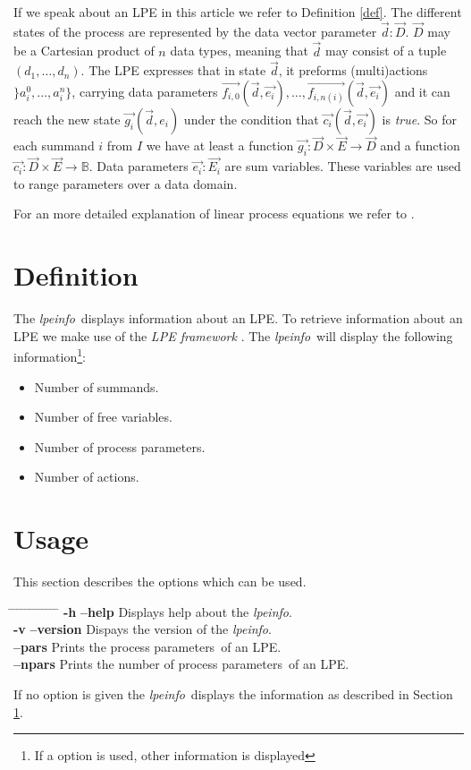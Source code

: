 \documentclass[a4paper,10pt]{article}
\theoremstyle{plain}
\theoremstyle{definition}
\newcommand{\lpe}{linear process equation}
\newcommand{\tool}{\textit{lpeinfo}}
\newcommand{\ti}{\textit}
\newcommand{\tb}{\textbf}
\newcommand{\ovr}{\overrightarrow}
\newcommand{\pps}{process parameters}
\newcommand{\framework}{\textit{LPE framework} \cite{LPEframework}}
\newcommand{\tab}{\hspace*{5.mm} \= \hspace*{5.mm} \= \hspace*{5.mm} \= \hspace*{5.mm} \= \hspace*{5.mm} \= \hspace*{5.mm}  \= \hspace*{5.mm}  \= \hspace*{5.mm}  \= \hspace*{5.mm} \= \hspace*{5.mm} \= \hspace*{5.mm}  \= \hspace*{5.mm}  \= \hspace*{5.mm}\kill}
\begin{document}
\noindent If we speak about an LPE in this article we refer to Definition \ref{def}.  The different states 
of the process are represented by the data vector parameter $\ovr{d}:\ovr{D}$. $\ovr{D}$ may be a Cartesian product of $n$ data types, meaning that $\ovr{d}$ may consist of a tuple $(d_1, \ldots, d_n)$. The LPE expresses that in state $\ovr{d}$, it preforms (multi)actions $\rbrace a_i^0, \ldots , a_i^n \rbrace$, carrying data parameters $\ovr{f_{i,0}}(\ovr{d},\ovr{e_i}), \ldots , \ovr{f_{i,n(i)}}(\ovr{d},\ovr{e_i})$ and 
it can reach the new state $\ovr{g_i}(\ovr{d},e_i)$ under the condition that $\ovr{c_i}(\ovr{d},\ovr{e_i})$ is \ti{true}. So for each summand $i$ from $I$ we have at least a function $\ovr{g_i}: \ovr{D} \times \ovr{E} \rightarrow \ovr{D}$ and a function $\ovr{c_i}: \ovr{D} \times \ovr{E} \rightarrow \mathbb{B}$.
Data parameters $\ovr{e_i} : \ovr{E_i}$ are sum variables. These variables are used to range parameters over a data domain. 

\noindent For an more detailed explanation of \lpe s  we refer to \cite{LPE_info}.

\section{Definition}\label{Def}
The \tool\ displays information about an LPE. To retrieve information about an LPE we make use of the \framework .  The \tool\ will display the following information\footnote{If a option is used, other information is displayed}:
\begin{itemize}
\item Number of summands.
\item Number of free variables.
\item Number of process parameters.
\item Number of actions.
\end{itemize}

\section{Usage}
This section describes the options which can be used.
\begin{tabbing}
\tab
\> \tb{-h} \> \> \tb{--help} \> \> \> Displays help about the \tool .\\
\> \tb{-v} \> \> \tb{--version} \> \> \> Dispays the version of the \tool .\\
\>         \> \> \tb{--pars} \> \> \> Prints the \pps\ of an LPE.\\
\>         \> \> \tb{--npars} \> \> \> Prints the number of \pps\ of an LPE.\\
\end{tabbing}
If no option is given the \tool\ displays the information as described in Section \ref{Def}.
\end{document}
